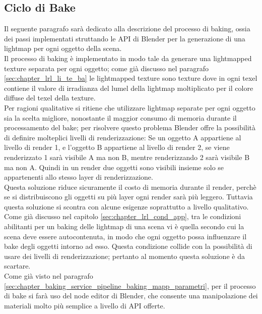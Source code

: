 \newpage
\subsection{Ciclo di Bake}
\label{sec:chapter_baking_service_pipeline_baking_ciclo_bake}

Il seguente paragrafo sarà dedicato alla descrizione del processo di baking, ossia dei passi implementati struttando le API di Blender per la generazione di una lightmap per ogni oggetto della scena.
\\ 
Il processo di baking è implementato in modo tale da generare una lightmapped texture separata per ogni oggetto; come già discusso nel paragrafo \ref{sec:chapter_lrl_li_te_ba} le lightmapped texture sono texture dove in ogni texel contiene il valore di irradianza del lumel della lightmap moltiplicato per il colore diffuse del texel della texture. 
\\
Per ragioni qualitative si ritiene che utilizzare lightmap separate per ogni oggetto sia la scelta migliore, nonostante il maggior consumo di memoria durante il processamento del bake; per risolvere questo problema Blender offre la possibilità di definire molteplici livelli di renderizzazione: 
Se un oggetto A appartiene al livello di render 1, e l’oggetto B appartiene al livello di render 2, se viene renderizzato 1 sarà visibile A ma non B, mentre renderizzando 2 sarà visibile B ma non A. Quindi in un render due oggetti sono visibili insieme solo se appartenenti allo stesso layer di renderizzazione. 
\\
Questa soluzione riduce sicuramente il costo di memoria durante il render, perchè se si distribuiscono gli oggetti su più layer ogni render sarà più leggero. Tuttavia questa soluzione si scontra con alcune esigenze soprattutto a livello qualitativo. 
\\
Come già discusso nel capitolo \ref{sec:chapter_lrl_cond_app}, tra le condizioni abilitanti per un baking delle lightmap di una scena vi è quella secondo cui la scena deve essere autocontenuta, in modo che ogni oggetto possa influenzare il bake degli oggetti intorno ad esso. Questa condizione collide con la possibilità di usare dei livelli di renderizzazione; pertanto al momento questa soluzione è da scartare.
\\
Come già visto nel paragrafo \ref{sec:chapter_baking_service_pipeline_baking_mapp_parametri}, per il processo di bake si farà uso del node editor di Blender, che consente una manipolazione dei materiali molto più semplice a livello di API offerte. 
\\
